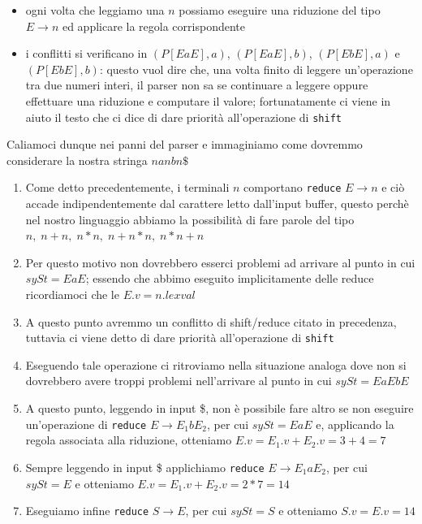 \documentclass[class=book, crop=false, oneside, 12pt]{standalone}
\begin{document}
\begin{itemize}
    \item ogni volta che leggiamo una \(n\) possiamo eseguire una riduzione del tipo \(E \to n\) ed applicare la regola corrispondente
    \item i conflitti si verificano in \((P[EaE],a)\), \((P[EaE],b)\), \((P[EbE],a)\) e \((P[EbE],b)\): questo vuol dire che, una volta finito di leggere un'operazione tra due numeri interi, il parser non sa se continuare a leggere oppure effettuare una riduzione e computare il valore; fortunatamente ci viene in aiuto il testo che ci dice di dare priorità all'operazione di \texttt{shift}
\end{itemize}

Caliamoci dunque nei panni del parser e immaginiamo come dovremmo considerare la nostra stringa \(nanbn\$\)

\begin{enumerate}
    \item Come detto precedentemente, i terminali \(n\) comportano \texttt{reduce} \(E \to n\) e ciò accade indipendentemente dal carattere letto dall'input buffer, questo perchè nel nostro linguaggio abbiamo la possibilità di fare parole del tipo \(n,\; n+n,\; n*n,\; n+n*n,\; n*n+n\)
    \item Per questo motivo non dovrebbero esserci problemi ad arrivare al punto in cui \(sySt = EaE\); essendo che abbimo eseguito implicitamente delle reduce ricordiamoci che le \(E.v = n.lexval\)
    \item A questo punto avremmo un conflitto di shift/reduce citato in precedenza, tuttavia ci viene detto di dare priorità all'operazione di \texttt{shift}
    \item Eseguendo tale operazione ci ritroviamo nella situazione analoga dove non si dovrebbero avere troppi problemi nell'arrivare al punto in cui \(sySt = EaEbE\)
    \item A questo punto, leggendo in input \$, non è possibile fare altro se non eseguire un'operazione di \texttt{reduce} \(E \to E_1bE_2\), per cui \(sySt = EaE\) e, applicando la regola associata alla riduzione, otteniamo \(E.v = E_1.v + E_2.v = 3 + 4 = 7\) 
    \item Sempre leggendo in input \$ applichiamo \texttt{reduce} \(E \to E_1aE_2\), per cui \(sySt = E\) e otteniamo \(E.v = E_1.v + E_2.v = 2 * 7 = 14\)
    \item Eseguiamo infine \texttt{reduce} \(S \to E\), per cui \(sySt = S\) e otteniamo \(S.v = E.v = 14\)
\end{enumerate}
\end{document}

